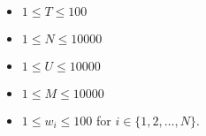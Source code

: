 \begin{itemize}
\tightlist
\item $1\leq T\leq 100$
\item $1\leq N \leq 10000$
\item $1\leq U \leq 10000$
\item $1\leq M \leq 10000$
\item $1\leq w_i \leq 100$ for $i\in\{1,2,\ldots,N\}$.
\end{itemize}

